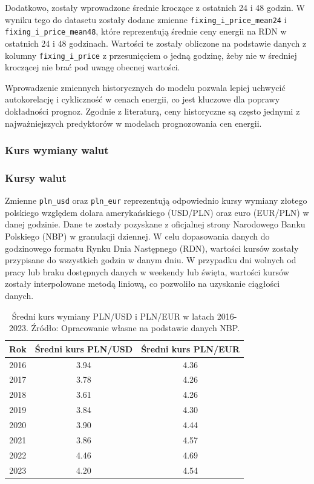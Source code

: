 Dodatkowo, zostały wprowadzone średnie kroczące z ostatnich 24 i 48 godzin. W wyniku tego do datasetu zostały dodane zmienne \texttt{fixing\_i\_price\_mean24} i \texttt{fixing\_i\_price\_mean48}, które reprezentują średnie ceny energii na RDN w ostatnich 24 i 48 godzinach. Wartości te zostały obliczone na podstawie danych z kolumny \texttt{fixing\_i\_price} z przesunięciem o jedną godzinę, żeby nie w średniej kroczącej nie brać pod uwagę obecnej wartości.

Wprowadzenie zmiennych historycznych do modelu pozwala lepiej uchwycić autokorelację i cykliczność w cenach energii, co jest kluczowe dla poprawy dokładności prognoz. Zgodnie z literaturą, ceny historyczne są często jednymi z najważniejszych predyktorów w modelach prognozowania cen energii.

\subsubsection{Kurs wymiany walut}
\label{subsec:waluty}

\subsubsection{Kursy walut}
\label{subsec:exchange-rates}

Zmienne \texttt{pln\_usd} oraz \texttt{pln\_eur} reprezentują odpowiednio kursy wymiany złotego polskiego względem dolara amerykańskiego (USD/PLN) oraz euro (EUR/PLN) w danej godzinie. Dane te zostały pozyskane z oficjalnej strony Narodowego Banku Polskiego (NBP) \cite{NBP_RATES} w granulacji dziennej. W celu dopasowania danych do godzinowego formatu Rynku Dnia Następnego (RDN), wartości kursów zostały przypisane do wszystkich godzin w danym dniu. W przypadku dni wolnych od pracy lub braku dostępnych danych w weekendy lub święta, wartości kursów zostały interpolowane metodą liniową, co pozwoliło na uzyskanie ciągłości danych.

\begin{table}[H]
    \centering
    \begin{tabular}{|c|c|c|}
    \hline
    \textbf{Rok} & \textbf{Średni kurs PLN/USD} & \textbf{Średni kurs PLN/EUR} \\ \hline
    2016 & 3.94 & 4.36 \\ \hline
    2017 & 3.78 & 4.26 \\ \hline
    2018 & 3.61 & 4.26 \\ \hline
    2019 & 3.84 & 4.30 \\ \hline
    2020 & 3.90 & 4.44 \\ \hline
    2021 & 3.86 & 4.57 \\ \hline
    2022 & 4.46 & 4.69 \\ \hline
    2023 & 4.20 & 4.54 \\ \hline
    \end{tabular}
    \caption{Średni kurs wymiany PLN/USD i PLN/EUR w latach 2016-2023. Źródło: Opracowanie własne na podstawie danych NBP.}
    \label{tab:pln-usd-exchange-rate}
\end{table}

